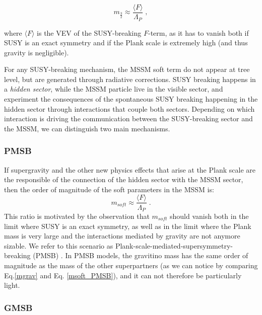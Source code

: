 \begin{equation}
m_{\frac{3}{2}} \approx \frac{\langle F \rangle}{\Lambda_P} \; ,
\label{mgrav}
\end{equation}

where $\langle F \rangle$ is the VEV of the SUSY-breaking $F$-term, as it has to vanish both if SUSY is an exact symmetry and if the Plank scale is extremely high (and thus gravity is negligible). 

For any SUSY-breaking mechanism, the MSSM soft term do not appear at tree level, but are generated through radiative corrections. SUSY breaking happens in a \textit{hidden sector}, while the MSSM particle live in the visible sector, and experiment the consequences of the spontaneous SUSY breaking happening in the hidden sector through interactions that couple both sectors. Depending on which interaction is driving the communication between the SUSY-breaking sector and the MSSM, we can distinguish two main mechanisms.

\subsubsection*{PMSB} 

If supergravity and the other new physics effects that arise at the Plank scale are the responsible of the connection of the hidden sector with the MSSM sector, then the order of magnitude of the soft parameters in the MSSM is:
\begin{equation}
m_{soft} \approx \frac{\langle F \rangle}{\Lambda_P} \; .
\label{msoft_PMSB}
\end{equation}
This ratio is motivated by the observation that $m_{soft}$ should vanish both in the limit where SUSY is an exact symmetry, as well as in the limit where the Plank mass is very large and the interactions mediated by gravity are not anymore sizable. We refer to this scenario as Plank-scale-mediated-supersymmetry-breaking (PMSB) \cite{PhysRevLett.49.970}\cite{BARBIERI1982343}\cite{IBANEZ198273}\cite{PhysRevD.27.2359}. In PMSB models, the gravitino mass has the same order of magnitude as the mass of the other superpartners (as we can notice by comparing Eq.\ref{mgrav} and Eq. \ref{msoft_PMSB}), and it can not therefore be particularly light. 

\subsubsection*{GMSB}

